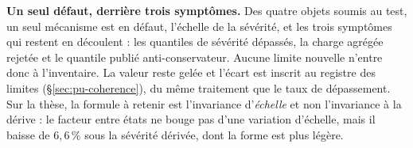 \begin{cle}
\textbf{Un seul défaut, derrière trois symptômes.} Des quatre objets soumis au test, un seul
mécanisme est en défaut, l'échelle de la sévérité, et les trois symptômes qui restent en
découlent : les quantiles de sévérité dépassés, la charge agrégée rejetée et le quantile publié
anti-conservateur. Aucune limite nouvelle n'entre donc à l'inventaire. La valeur reste
gelée et l'écart est inscrit au registre des limites (\S\ref{sec:pu-coherence}), du même
traitement que le taux de dépassement. Sur la thèse, la formule à retenir est
l'invariance d'\emph{échelle} et non l'invariance à la dérive : le facteur entre états ne bouge
pas d'une variation d'échelle, mais il baisse de $6{,}6\,\%$ sous la sévérité dérivée, dont la
forme est plus légère.
\end{cle}



